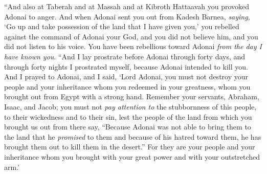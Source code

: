 \begin{biblechapter}
\verse “And also at Taberah and at Massah and at Kibroth Hattaavah you provoked Adonai to anger.
\verse And when Adonai sent you out from Kadesh Barnea, \textit{saying}, ‘Go up and take possession of the land that I have given you,’ you rebelled against the command of Adonai your God, and you did not believe him, and you did not listen to his voice.
\verse You have been rebellious toward Adonai \textit{from the day I have known you}.
\verse “And I lay prostrate before Adonai through forty days, and through forty nights I prostrated myself, because Adonai intended to kill you.
\verse And I prayed to Adonai, and I said, ‘Lord Adonai, you must not destroy your people and your inheritance whom you redeemed in your greatness, whom you brought out from Egypt with a strong hand.
\verse Remember your servants, Abraham, Isaac, and Jacob; you must not \textit{pay attention to} the stubbornness of this people, to their wickedness and to their sin,
\verse lest the people of the land from which you brought us out from there say, “Because Adonai was not able to bring them to the land that he \textit{promised} to them and because of his hatred toward them, he has brought them out to kill them in the desert.”
\verse For they are your people and your inheritance whom you brought with your great power and with your outstretched arm.’
\end{biblechapter}

